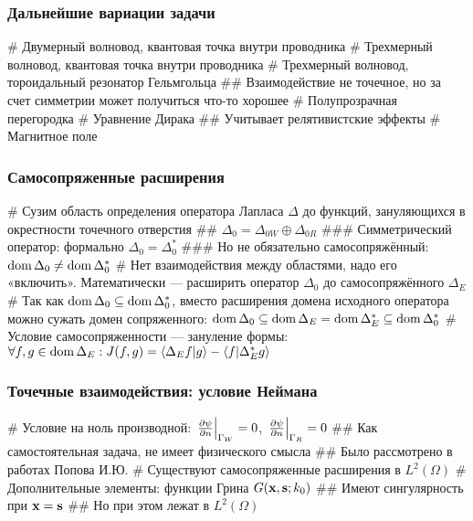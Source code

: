 \documentclass{beamer}
\begin{document}
\begin{frame}[fragile]
\frametitle{Дальнейшие вариации задачи}
\begin{easylist}[itemize]
# Двумерный волновод, квантовая точка внутри проводника
# Трехмерный волновод, квантовая точка внутри проводника
# Трехмерный волновод, тороидальный резонатор Гельмгольца
## Взаимодействие не точечное, но за счет симметрии может получиться что-то хорошее
# Полупрозрачная перегородка 
# Уравнение Дирака
## Учитывает релятивистские эффекты
# Магнитное поле
\end{easylist}
\end{frame}


\begin{frame}[fragile]
\frametitle{Самосопряженные расширения}
\begin{easylist}[itemize]
# Сузим область определения оператора Лапласа $\Delta$ до функций, зануляющихся в окрестности точечного отверстия
## $\Delta_0 = \Delta_{0W} \oplus \Delta_{0R}$
### Симметрический оператор: формально $\Delta_0 = \Delta_0^*$
### Но не обязательно самосопряжённый:$\operatorname{dom}{\Delta_0} \ne \operatorname{dom}{\Delta_0^*}$
# Нет взаимодействия между областями, надо его «включить». Математически — расширить оператор $\Delta_0$ до самосопряжённого $\Delta_E$
# Так как $\operatorname{dom}{\Delta_0} \subseteq \operatorname{dom}{\Delta_0^*}$, вместо расширения домена исходного оператора можно сужать домен сопряженного: $\operatorname{dom}{\Delta_0} \subseteq \operatorname{dom}{\Delta_E} = \operatorname{dom}{\Delta_E^*} \subseteq \operatorname{dom}{\Delta_0^*}$
# Условие самосопряженности — зануление формы: $\forall f, g \in \dom{\Delta_E}: J(f, g) = \ip{\Delta_E f}{g} - \ip{f}{\Delta_E^* g}$
\end{easylist}
\end{frame}

\begin{frame}[fragile]
\frametitle{Точечные взаимодействия: условие Неймана}
\begin{easylist}[itemize]
# Условие на ноль производной: $\eval{\pdv{\psi}{n}}_{\Gamma_W} = 0$, $\eval{\pdv{\psi}{n}}_{\Gamma_R} = 0$
## Как самостоятельная задача, не имеет физического смысла
## Было рассмотрено в работах Попова И.Ю.
# Существуют самосопряженные расширения в $L^2(\Omega)$
# Дополнительные элементы: функции Грина $G(\vb{x}, \vb{s}; k_0)$
## Имеют сингулярность при $\vb{x} = \vb{s}$
## Но при этом лежат в $L^2(\Omega)$
\end{easylist}
\end{frame}
\end{document}

